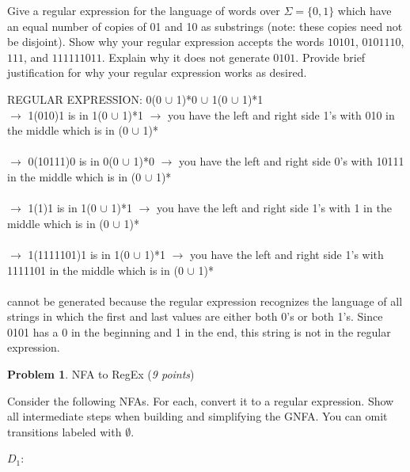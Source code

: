 \documentclass[11pt]{article}
\theoremstyle{definition}
\theoremstyle{theorem}
\newtheorem{prob}{Problem}
\newcommand{\solution}{\medskip\noindent{\color{blue}\textbf{Solution:}}}
\begin{document}
Give a regular expression for the language of words over $\Sigma = \{0, 1\}$ which have an equal number of copies of 01 and 10 as substrings (note: these copies need not be disjoint). Show why your regular expression accepts the words $10101$, $0101110$, $111$, and $111111011$. Explain why it does not generate $0101$. Provide brief justification for why your regular expression works as desired.

\solution

\noindent REGULAR EXPRESSION: 0(0 $\cup$ 1)*0 $\cup$ 1(0 $\cup$ 1)*1 \\

 $\rightarrow$ 1(010)1 is in 1(0 $\cup$ 1)*1 $\rightarrow$ you have the left and right side 1's with 010 in the middle which is in (0 $\cup$ 1)* \\~\\
 $\rightarrow$ 0(10111)0 is in 0(0 $\cup$ 1)*0  $\rightarrow$ you have the left and right side 0's with 10111 in the middle which is in (0 $\cup$ 1)* \\~\\
 $\rightarrow$ 1(1)1 is in 1(0 $\cup$ 1)*1  $\rightarrow$ you have the left and right side 1's with 1 in the middle which is in (0 $\cup$ 1)* \\~\\
 $\rightarrow$ 1(1111101)1 is in 1(0 $\cup$ 1)*1  $\rightarrow$ you have the left and right side 1's with 1111101 in the middle which is in (0 $\cup$ 1)* \\~\\
 cannot be generated because the regular expression recognizes the language of all strings in which the first and last values are either both 0's or both 1's. Since 0101 has a 0 in the beginning and 1 in the end, this string is not in the regular expression. 



\newpage

\begin{prob} NFA to RegEx (\emph{9 points})\end{prob}

Consider the following NFAs. For each, convert it to a regular expression. Show all intermediate steps when building and simplifying the GNFA. You can omit transitions labeled with $\emptyset$.

$D_1$:

\\
\end{document}
